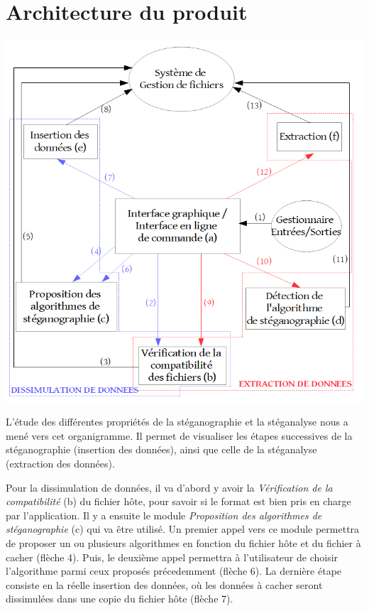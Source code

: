 \documentclass[11pt]{article}
\begin{document}
\section{Architecture du produit}

\hspace{0.5cm}
\includegraphics[scale=0.55]{pictures/organigramme.png}
\newpage

L'étude des différentes propriétés de la stéganographie et la stéganalyse 
nous a mené vers cet organigramme. 
Il permet de visualiser les étapes successives de la stéganographie 
(insertion des données), ainsi que celle de la stéganalyse (extraction 
des données). 

Pour la dissimulation de données, il va d'abord y avoir la \textit{Vérification 
de la compatibilité} (b) du fichier hôte, pour savoir si le format est bien 
pris en charge par l'application. 
Il y a ensuite le module \textit{Proposition des algorithmes de stéganographie} 
(c) qui va être utilisé. Un premier appel vers ce module permettra de proposer 
un ou plusieurs algorithmes en fonction du fichier hôte et du fichier à cacher (flèche 4). 
Puis, le deuxième appel permettra à l'utilisateur de choisir l'algorithme 
parmi ceux proposés précedemment (flèche 6). 
La dernière étape consiste en la réelle insertion des données, où les 
données à cacher seront dissimulées dans une copie du fichier hôte (flèche 7). 
\end{document}
